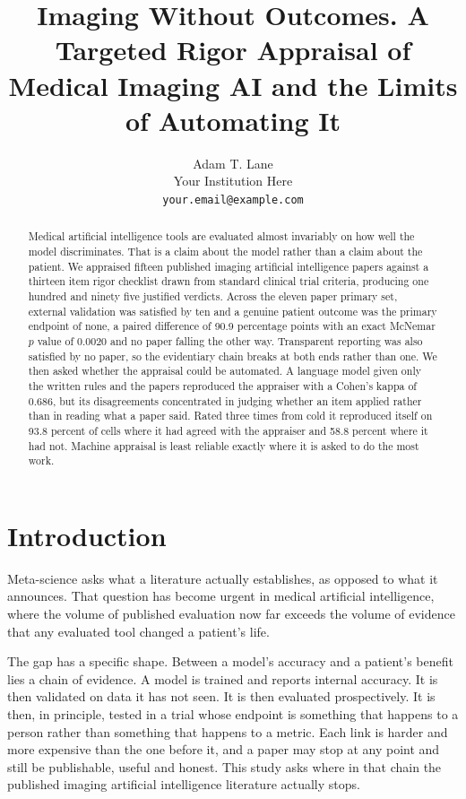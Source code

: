 \documentclass{article}
\title{Imaging Without Outcomes. A Targeted Rigor Appraisal of Medical
Imaging AI and the Limits of Automating It}
\author{%
  Adam T. Lane \\
  Your Institution Here \\
  \texttt{your.email@example.com} \\
}
\begin{document}
\maketitle

\begin{abstract}
Medical artificial intelligence tools are evaluated almost invariably on how well the model
discriminates. That is a claim about the model rather than a claim about the patient. We appraised
fifteen published imaging artificial intelligence papers against a thirteen item rigor checklist
drawn from standard clinical trial criteria, producing one hundred and ninety five justified
verdicts. Across the eleven paper primary set, external validation was satisfied by ten and a
genuine patient outcome was the primary endpoint of none, a paired difference of 90.9 percentage
points with an exact McNemar $p$ value of 0.0020 and no paper falling the other way. Transparent
reporting was also satisfied by no paper, so the evidentiary chain breaks at both ends rather than
one. We then asked whether the appraisal could be automated. A language model given only the written
rules and the papers reproduced the appraiser with a Cohen's kappa of 0.686, but its disagreements
concentrated in judging whether an item applied rather than in reading what a paper said. Rated
three times from cold it reproduced itself on 93.8 percent of cells where it had agreed with the
appraiser and 58.8 percent where it had not. Machine appraisal is least reliable exactly where it is
asked to do the most work.
\end{abstract}

\section{Introduction}
\label{sec:intro}

Meta-science asks what a literature actually establishes, as opposed to what it announces. That
question has become urgent in medical artificial intelligence, where the volume of published
evaluation now far exceeds the volume of evidence that any evaluated tool changed a patient's life.

The gap has a specific shape. Between a model's accuracy and a patient's benefit lies a chain of
evidence. A model is trained and reports internal accuracy. It is then validated on data it has not
seen. It is then evaluated prospectively. It is then, in principle, tested in a trial whose endpoint
is something that happens to a person rather than something that happens to a metric. Each link is
harder and more expensive than the one before it, and a paper may stop at any point and still be
publishable, useful and honest. This study asks where in that chain the published imaging
artificial intelligence literature actually stops.
\end{document}
